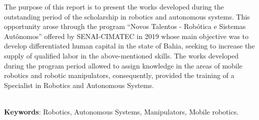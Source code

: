 \begin{thesisabastract}
  The purpose of this report is to present the works developed during the outstanding period of the scholarship in robotics and autonomous systems. This opportunity arose through the program “Novos Talentos - Robótica e Sistemas Autônomos” offered by SENAI-CIMATEC in 2019 whose main objective was to develop differentiated human capital in the state of Bahia, seeking to increase the supply of qualified labor in the above-mentioned skills. The works developed during the program period allowed to assign knowledge in the areas of mobile robotics and robotic manipulators, consequently, provided the training of a Specialist in Robotics and Autonomous Systems.

\ \\


\textbf{Keywords}: Robotics, Autonomous Systems, Manipulators, Mobile robotics.

\end{thesisabastract}
